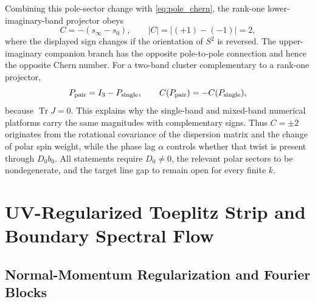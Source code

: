 \documentclass[11pt]{article}
\numberwithin{equation}{section}
\begin{document}
Combining this pole-sector change with \eqref{eq:pole_chern},
the rank-one lower-imaginary-band projector obeys
\begin{equation}
  C=-\left(s_\infty-s_0\right),
  \qquad
  |C|=|(+1)-(-1)|=2,
  \label{eq:lower_imaginary_band_chern}
\end{equation}
where the displayed sign changes if the orientation of $S^2$ is reversed.
The upper-imaginary companion branch has the opposite pole-to-pole connection and hence
the opposite Chern number. For a two-band cluster complementary to a
rank-one projector,
\begin{equation}
  P_{\rm pair}=I_3-P_{\rm single},
  \qquad
  C(P_{\rm pair})=-C(P_{\rm single}),
  \label{eq:complementary_cluster_chern}
\end{equation}
because $\operatorname{Tr}J=0$. This explains why the single-band and
mixed-band numerical platforms carry the same magnitudes with
complementary signs. Thus $C=\pm2$ originates from the rotational
covariance of the dispersion matrix and the change of polar spin
weight, while the phase lag $\alpha$ controls whether that twist is
present through $D_0b_0$. All statements require $D_0\ne0$, the relevant
polar sectors to be nondegenerate, and the target line gap to remain
open for every finite $k$.

\section{UV-Regularized Toeplitz Strip and Boundary Spectral Flow}

\subsection{Normal-Momentum Regularization and Fourier Blocks}
\end{document}
